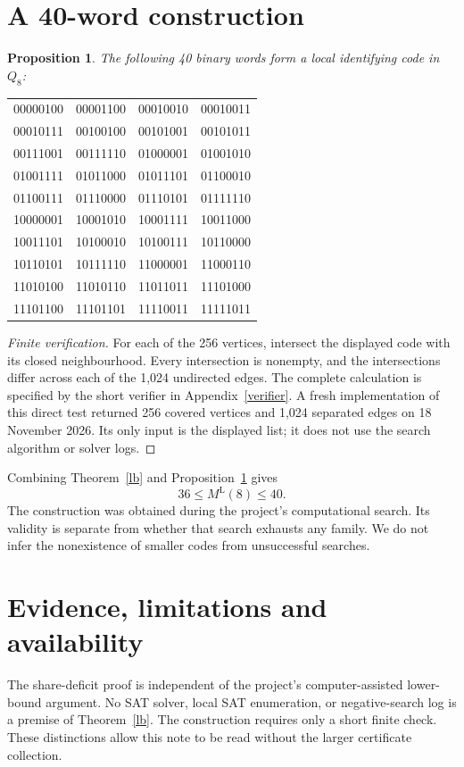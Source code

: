 \documentclass[11pt]{article}
\newtheorem{proposition}[theorem]{Proposition}
\newcommand{\ML}{M^{\mathrm L}}
\begin{document}
\section{A 40-word construction}
\begin{proposition}\label{ub}
The following 40 binary words form a local identifying code in $Q_8$:
\end{proposition}
\begin{center}\ttfamily
\begin{tabular}{llll}
00000100&00001100&00010010&00010011\\
00010111&00100100&00101001&00101011\\
00111001&00111110&01000001&01001010\\
01001111&01011000&01011101&01100010\\
01100111&01110000&01110101&01111110\\
10000001&10001010&10001111&10011000\\
10011101&10100010&10100111&10110000\\
10110101&10111110&11000001&11000110\\
11010100&11010110&11011011&11101000\\
11101100&11101101&11110011&11111011
\end{tabular}\end{center}
\begin{proof}[Finite verification]
For each of the 256 vertices, intersect the displayed code with its closed neighbourhood. Every intersection is nonempty, and the intersections differ across each of the 1,024 undirected edges. The complete calculation is specified by the short verifier in Appendix~\ref{verifier}. A fresh implementation of this direct test returned 256 covered vertices and 1,024 separated edges on 18 November 2026. Its only input is the displayed list; it does not use the search algorithm or solver logs.
\end{proof}
Combining Theorem~\ref{lb} and Proposition~\ref{ub} gives
\[
 \boxed{36\le\ML(8)\le40.}
\]
The construction was obtained during the project's computational search. Its validity is separate from whether that search exhausts any family. We do not infer the nonexistence of smaller codes from unsuccessful searches.

\section{Evidence, limitations and availability}
The share-deficit proof is independent of the project's computer-assisted lower-bound argument. No SAT solver, local SAT enumeration, or negative-search log is a premise of Theorem~\ref{lb}. The construction requires only a short finite check. These distinctions allow this note to be read without the larger certificate collection.
\end{document}
